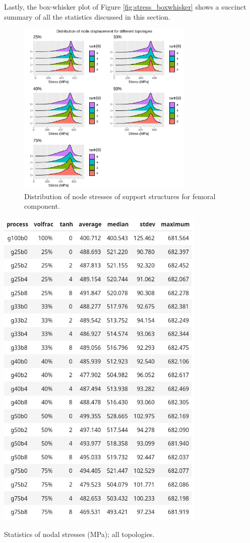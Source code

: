 \documentclass[../main.tex]{subfiles}
\begin{document}
Lastly, the box-whisker plot of Figure \ref{fig:stress_boxwhisker} shows a succinct summary of all the statistics discussed in this section.

\begin{figure}[h!]
  \centering
  \includegraphics[width=0.75\textwidth]{images/results/plots/femoral/stress/stress_density_ridges.png}
  \caption{Distribution of node stresses of support structures for femoral component.}
\end{figure}

\begin{table}[h!]
  \centering
  \includegraphics[width=0.75\textwidth]{images/results/plots/femoral/stress/stress_stats.png}
  \caption{Statistics of nodal stresses (MPa); all topologies.}
  \label{table:stress_stats}
\end{table}
\end{document}

